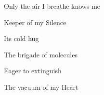 \documentclass{article}
\begin{document}
\newline

Only the air I breathe knows me 
\newline

Keeper of my Silence 
\newline

Its cold hug
\newline

The brigade of molecules
\newline

Eager to extinguish
\newline

The vacuum of my Heart 
\newline
\end{document}
